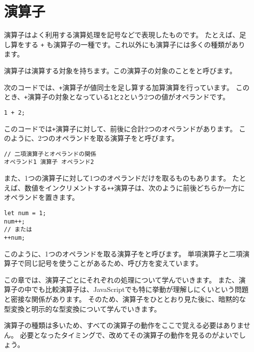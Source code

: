 \hypertarget{operator}{%
\chapter{演算子}\label{operator}}
\thispagestyle{frontheadings}

演算子はよく利用する演算処理を記号などで表現したものです。
たとえば、足し算をする \texttt{+}
も演算子の一種です。これ以外にも演算子には多くの種類があります。

演算子は演算する対象を持ちます。この演算子の対象のことを\textbf{}と呼びます。

次のコードでは、\texttt{+}演算子が値同士を足し算する加算演算を行っています。
このとき、\texttt{+}演算子の対象となっている\texttt{1}と\texttt{2}という2つの値がオペランドです。

\begin{lstlisting}
1 + 2;
\end{lstlisting}

このコードでは\texttt{+}演算子に対して、前後に合計2つのオペランドがあります。
このように、2つのオペランドを取る演算子を\textbf{}と呼びます。

\begin{lstlisting}
// 二項演算子とオペランドの関係
オペランド1 演算子 オペランド2
\end{lstlisting}

また、1つの演算子に対して1つのオペランドだけを取るものもあります。
たとえば、数値をインクリメントする\texttt{++}演算子は、次のように前後どちらか一方にオペランドを置きます。

\begin{lstlisting}
let num = 1;
num++;
// または
++num;
\end{lstlisting}

このように、1つのオペランドを取る演算子を\textbf{}と呼びます。
単項演算子と二項演算子で同じ記号を使うことがあるため、呼び方を変えています。

この章では、演算子ごとにそれぞれの処理について学んでいきます。
また、演算子の中でも比較演算子は、JavaScriptでも特に挙動が理解しにくい\textbf{}という問題と密接な関係があります。
そのため、演算子をひととおり見た後に、暗黙的な型変換と明示的な型変換について学んでいきます。

演算子の種類は多いため、すべての演算子の動作をここで覚える必要はありません。
必要となったタイミングで、改めてその演算子の動作を見るのがよいでしょう。

